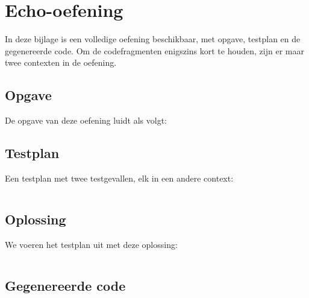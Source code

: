 \chapter{Echo-oefening}\label{ch:echo-oefening}

In deze bijlage is een volledige oefening beschikbaar, met opgave, testplan en de gegenereerde code.
Om de codefragmenten enigszins kort te houden, zijn er maar twee contexten in de oefening.

\section{Opgave}\label{sec:echo-opgave}

De opgave van deze oefening luidt als volgt:

\begin{quote}
\end{quote}

\section{Testplan}\label{sec:echo-testplan}

Een testplan met twee testgevallen, elk in een andere context:

\inputminted{json}{sources/echo-c/two.tson}

\section{Oplossing}\label{sec:echo-oplossing}

We voeren het testplan uit met deze oplossing:

\inputminted{c}{sources/echo-c/correct.c}

\section{Gegenereerde code}\label{sec:echo-gegenereerde-code}

